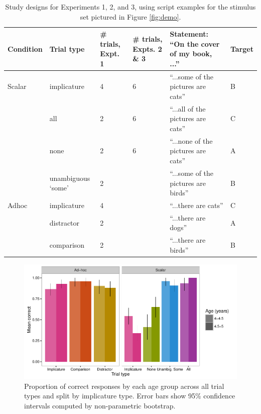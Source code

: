 \documentclass[man]{apa2}
\begin{document}
{ \begin{table}
 \footnotesize
 \centering
     \begin{tabular}{C{1.5cm} C{2cm} C{1.5cm} C{1.5cm} C{4.5cm} C{1.5cm}}
                      \hline
       \null   Condition  & Trial type & \# trials, Expt. 1 & \# trials, Expts. 2 \& 3 & Statement: ``On the cover of my book, ...'' & Target   \\
       \hline
            Scalar & implicature & 4 & 6 &  ``...some of the pictures are cats'' & B	 \\
          & all  & 2 &  6 & ``...all of the pictures are cats'' & C		                 \\
           & none  & 2 & 6 & ``...none of the pictures are cats'' & A			\\
               & unambiguous `some' 	&  2 &  & ``...some of the pictures are birds'' & B					        \\
	\hline
	    Adhoc       & implicature & 4 &  & ``...there are cats'' & C 		\\
	     & distractor & 2 &  & ``...there are dogs'' & A	     \\
          & comparison & 2 &  & ``...there are birds'' & B 	   \\
       \hline
     \end{tabular}
     \caption{Study designs for Experiments 1, 2, and 3, using script examples for the stimulus set pictured in Figure \ref{fig:demo}. \label{tab:scripts} }
 \end{table}
 
 \begin{figure}
 \begin{center}
  \includegraphics[width=6in]{figures/exp1_performance.pdf}
  \caption{\label{fig:exp1_perf} Proportion of correct responses by each age group across all trial types and split by implicature type. Error bars show 95\% confidence intervals computed by non-parametric bootstrap.}
 \end{center}
\end{figure}

}
\end{document}
